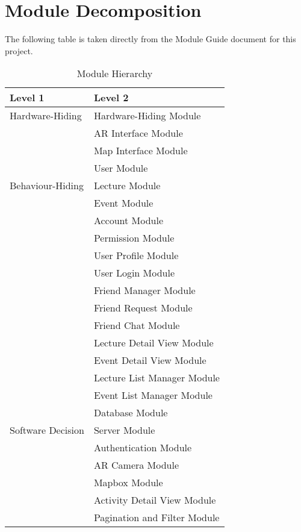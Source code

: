 \documentclass[12pt, titlepage]{article}
\begin{document}
\section{Module Decomposition}

The following table is taken directly from the Module Guide document for this project.

\begin{table}[h!]
\centering
\begin{tabular}{p{} p{}}
\toprule
\textbf{Level 1} & \textbf{Level 2}\\
\midrule

{Hardware-Hiding} & Hardware-Hiding Module \\
\midrule

\multirow{7}{0.3\textwidth}{Behaviour-Hiding}
& AR Interface Module\\
& Map Interface Module\\
& User Module\\
& Lecture Module\\
& Event Module\\
& Account Module\\
& Permission Module\\
& User Profile Module\\
& User Login Module\\
& Friend Manager Module\\ 
& Friend Request Module\\
& Friend Chat Module\\
& Lecture Detail View Module\\
& Event Detail View Module\\
& Lecture List Manager Module\\
& Event List Manager Module\\
\midrule

\multirow{3}{0.3\textwidth}{Software Decision}
& Database Module\\
& Server Module\\
& Authentication Module\\
& AR Camera Module\\
& Mapbox Module\\
& Activity Detail View Module\\
& Pagination and Filter Module\\
\bottomrule

\end{tabular}
\caption{Module Hierarchy}
\label{TblMH}
\end{table}
\end{document}
